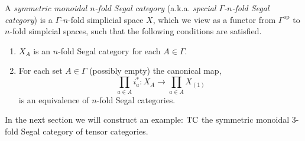 \documentclass{amsart}
\begin{document}
\begin{definition}
	A {\em symmetric monoidal $n$-fold Segal category} (a.k.a. {\em special $\Gamma$-$n$-fold Segal category}) is a $\Gamma$-$n$-fold simplicial space $X$, which we view as a functor from $\Gamma^\textrm{op}$ to $n$-fold simplcial spaces, such that the following conditions are satisfied. 
	\begin{enumerate}
		\item $X_A$ is an $n$-fold Segal category for each $A \in \Gamma$. 
		\item For each set $A \in \Gamma$ (possibly empty) the canonical map,
		\begin{equation*}
			\prod_{a \in A} i_a^*: X_A \to \prod_{a \in A} X_{(1)}
		\end{equation*}
		is an equivalence of $n$-fold Segal categories. %
	\end{enumerate}
\end{definition}

In the next section we will construct an example: $\mathrm{TC}$ the symmetric monoidal 3-fold Segal category of tensor categories. 

\end{document}
